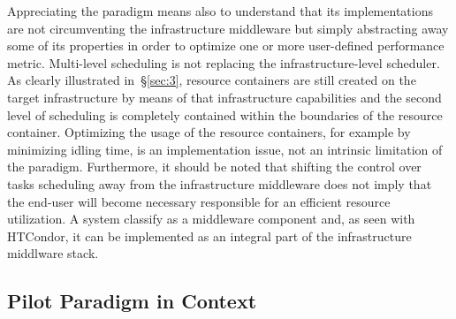 \documentclass{sig-alternate}
\begin{document}
Appreciating the \pilot paradigm means also to understand that its
implementations are not circumventing the infrastructure middleware but
simply abstracting away some of its properties in order to optimize one
or more user-defined performance metric. Multi-level scheduling is not
replacing the infrastructure-level scheduler. As clearly illustrated
in~\S\ref{sec:3}, resource containers are still created on the target
infrastructure by means of that infrastructure capabilities and the
second level of scheduling is completely contained within the boundaries
of the resource container. Optimizing the usage of the resource
containers, for example by minimizing idling time, is an implementation
issue, not an intrinsic limitation of the \pilot paradigm. Furthermore,
it should be noted that shifting the control over tasks scheduling away
from the infrastructure middleware does not imply that the end-user will
become necessary responsible for an efficient resource utilization. A
\pilot system classify as a middleware component and, as seen with
HTCondor, it can be implemented as an integral part of the
infrastructure middlware stack.


\subsection{Pilot Paradigm in Context}
\label{sec:context}
\end{document}
